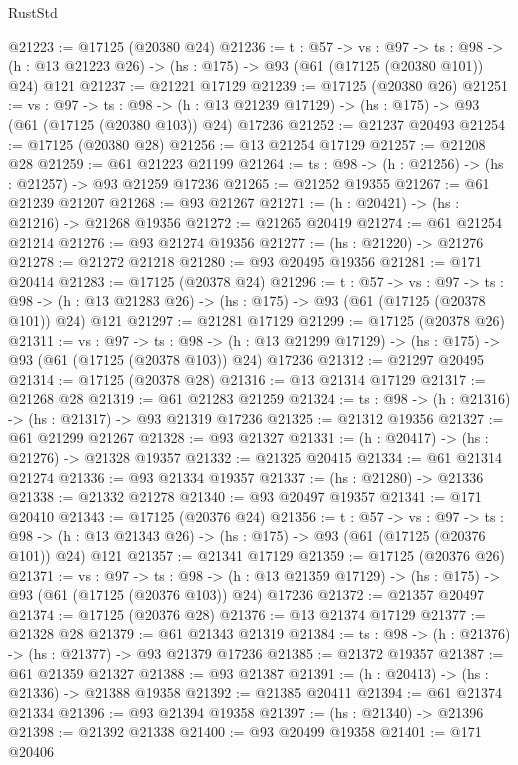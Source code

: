 \begin{lexlean}{RustStd}
\begin{coremodule}
@21223 := @17125 (@20380 @24)
@21236 := {t : @57} ->
  {vs : @97} ->
  {ts : @98} -> (h : @13 @21223 @26) -> (hs : @175) -> @93 (@61 (@17125 (@20380 @101)) @24) @121
@21237 := @21221 @17129
@21239 := @17125 (@20380 @26)
@21251 := {vs : @97} ->
  {ts : @98} ->
  (h : @13 @21239 @17129) -> (hs : @175) -> @93 (@61 (@17125 (@20380 @103)) @24) @17236
@21252 := @21237 @20493
@21254 := @17125 (@20380 @28)
@21256 := @13 @21254 @17129
@21257 := @21208 @28
@21259 := @61 @21223 @21199
@21264 := {ts : @98} -> (h : @21256) -> (hs : @21257) -> @93 @21259 @17236
@21265 := @21252 @19355
@21267 := @61 @21239 @21207
@21268 := @93 @21267
@21271 := (h : @20421) -> (hs : @21216) -> @21268 @19356
@21272 := @21265 @20419
@21274 := @61 @21254 @21214
@21276 := @93 @21274 @19356
@21277 := (hs : @21220) -> @21276
@21278 := @21272 @21218
@21280 := @93 @20495 @19356
@21281 := @171 @20414
@21283 := @17125 (@20378 @24)
@21296 := {t : @57} ->
  {vs : @97} ->
  {ts : @98} -> (h : @13 @21283 @26) -> (hs : @175) -> @93 (@61 (@17125 (@20378 @101)) @24) @121
@21297 := @21281 @17129
@21299 := @17125 (@20378 @26)
@21311 := {vs : @97} ->
  {ts : @98} ->
  (h : @13 @21299 @17129) -> (hs : @175) -> @93 (@61 (@17125 (@20378 @103)) @24) @17236
@21312 := @21297 @20495
@21314 := @17125 (@20378 @28)
@21316 := @13 @21314 @17129
@21317 := @21268 @28
@21319 := @61 @21283 @21259
@21324 := {ts : @98} -> (h : @21316) -> (hs : @21317) -> @93 @21319 @17236
@21325 := @21312 @19356
@21327 := @61 @21299 @21267
@21328 := @93 @21327
@21331 := (h : @20417) -> (hs : @21276) -> @21328 @19357
@21332 := @21325 @20415
@21334 := @61 @21314 @21274
@21336 := @93 @21334 @19357
@21337 := (hs : @21280) -> @21336
@21338 := @21332 @21278
@21340 := @93 @20497 @19357
@21341 := @171 @20410
@21343 := @17125 (@20376 @24)
@21356 := {t : @57} ->
  {vs : @97} ->
  {ts : @98} -> (h : @13 @21343 @26) -> (hs : @175) -> @93 (@61 (@17125 (@20376 @101)) @24) @121
@21357 := @21341 @17129
@21359 := @17125 (@20376 @26)
@21371 := {vs : @97} ->
  {ts : @98} ->
  (h : @13 @21359 @17129) -> (hs : @175) -> @93 (@61 (@17125 (@20376 @103)) @24) @17236
@21372 := @21357 @20497
@21374 := @17125 (@20376 @28)
@21376 := @13 @21374 @17129
@21377 := @21328 @28
@21379 := @61 @21343 @21319
@21384 := {ts : @98} -> (h : @21376) -> (hs : @21377) -> @93 @21379 @17236
@21385 := @21372 @19357
@21387 := @61 @21359 @21327
@21388 := @93 @21387
@21391 := (h : @20413) -> (hs : @21336) -> @21388 @19358
@21392 := @21385 @20411
@21394 := @61 @21374 @21334
@21396 := @93 @21394 @19358
@21397 := (hs : @21340) -> @21396
@21398 := @21392 @21338
@21400 := @93 @20499 @19358
@21401 := @171 @20406

\end{coremodule}
\end{lexlean}
